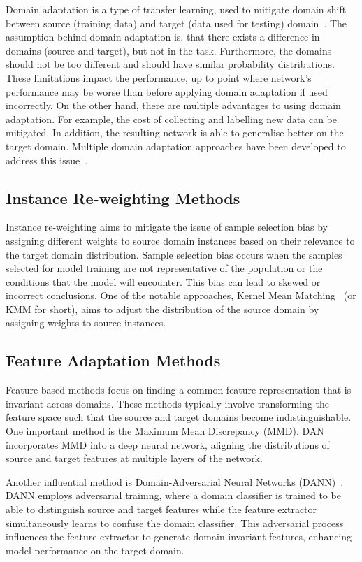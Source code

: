Domain adaptation is a type of transfer learning, used to mitigate domain shift between source (training data) and target (data used for testing) domain~\cite{domainAdaptation}.
The assumption behind domain adaptation is, that there exists a difference in domains (source and target), but not in the task. Furthermore, the domains should not be too different and should have similar probability distributions. These limitations impact the performance, up to point where network's performance may be worse than before applying domain adaptation if used incorrectly. On the other hand, there are multiple advantages to using domain adaptation. For example, the cost of collecting and labelling new data can be mitigated. In addition, the resulting network is able to generalise better on the target domain. Multiple domain adaptation approaches have been developed to address this issue~\cite{domainAdaptationGod}.

\subsection{Instance Re-weighting Methods}
\label{Instance}
  Instance re-weighting aims to mitigate the issue of sample selection bias by assigning different weights to source domain instances based on their relevance to the target domain distribution. Sample selection bias occurs when the samples selected for model training are not representative of the population or the conditions that the model will encounter.  This bias can lead to skewed or incorrect conclusions. One of the notable approaches, Kernel Mean Matching~\cite{instanceMethod} (or KMM for short),  aims to adjust the distribution of the source domain by assigning weights to source instances. 
 
 \subsection{Feature Adaptation Methods}
 \label{Feature}
 Feature-based methods focus on finding a common feature representation that is invariant across domains. These methods typically involve transforming the feature space such that the source and target domains become indistinguishable. One important method is the Maximum Mean Discrepancy (MMD). DAN~\cite{featureMethod} incorporates MMD into a deep neural network, aligning the distributions of source and target features at multiple layers of the network. %
 
 Another influential method is Domain-Adversarial Neural Networks (DANN)~\cite{featureMethod2}. DANN employs adversarial training, where a domain classifier is trained to be able to distinguish source and target features while the feature extractor simultaneously learns to confuse the domain classifier. This adversarial process influences the feature extractor to generate domain-invariant features, enhancing model performance on the target domain.
 
